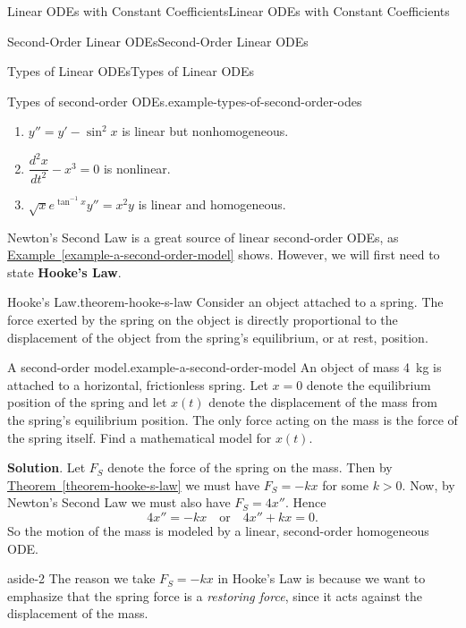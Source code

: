 \documentclass[10pt,]{book}
\newcommand{\terminology}[1]{\textbf{#1}}
\numberwithin{equation}{section}
\newcommand{\dv}[3][]{\dfrac{d^{#1} #2}{d #3^{#1}}}
\begin{document}
\begin{chapterptx}{Linear ODEs with Constant Coefficients}{}{Linear ODEs with Constant Coefficients}{}{}
\begin{sectionptx}{Second-Order Linear ODEs}{}{Second-Order Linear ODEs}{}{}
\begin{subsectionptx}{Types of Linear ODEs}{}{Types of Linear ODEs}{}{}
\begin{example}{Types of second-order ODEs.}{example-types-of-second-order-odes}
\begin{enumerate}
\item\hypertarget{li-14}{}\(y'' = y' - \sin^{2}x\) is linear but nonhomogeneous.%
\item\hypertarget{li-15}{}\(\dv[2]{x}{t} - x^{3} = 0\) is nonlinear.%
\item\hypertarget{li-16}{}\(\sqrt{x}e^{\tan^{-1}x}y'' = x^{2}y\) is linear and homogeneous.%
\end{enumerate}
%
\end{example}
\hypertarget{p-148}{}%
Newton's Second Law is a great source of linear second-order ODEs, as \hyperref[example-a-second-order-model]{Example~\ref{example-a-second-order-model}} shows. However, we will first need to state \terminology{Hooke's Law}.%
\begin{theorem}{Hooke's Law.}{}{theorem-hooke-s-law}%
\hypertarget{p-149}{}%
Consider an object attached to a spring. The force exerted by the spring on the object is directly proportional to the displacement of the object from the spring's equilibrium, or at rest, position.%
\end{theorem}
\begin{example}{A second-order model.}{example-a-second-order-model}%
\hypertarget{p-150}{}%
An object of mass \SI{4}{\kilo\gram} is attached to a horizontal, frictionless spring. Let \(x=0\) denote the equilibrium position of the spring and let \(x(t)\) denote the displacement of the mass from the spring's equilibrium position. The only force acting on the mass is the force of the spring itself. Find a mathematical model for \(x(t)\).%
\par\smallskip%
\noindent\textbf{Solution}.\hypertarget{solution-24}{}\quad%
\hypertarget{p-151}{}%
Let \(F_{S}\) denote the force of the spring on the mass. Then by \hyperref[theorem-hooke-s-law]{Theorem~\ref{theorem-hooke-s-law}} we must have \(F_{S} = -kx\) for some \(k>0\). Now, by Newton's Second Law we must also have \(F_{S} = 4x''\). Hence%
\begin{equation*}
4x'' = -kx\quad\text{or}\quad4x''+kx = 0.
\end{equation*}
So the motion of the mass is modeled by a linear, second-order homogeneous ODE.%
\end{example}
\begin{aside}{}{aside-2}%
\hypertarget{p-152}{}%
The reason we take \(F_{S} = -kx\) in Hooke's Law is because we want to emphasize that the spring force is a \emph{restoring force}, since it acts against the displacement of the mass.%
\end{aside}

\end{subsectionptx}
\end{sectionptx}
\end{chapterptx}
\end{document}
